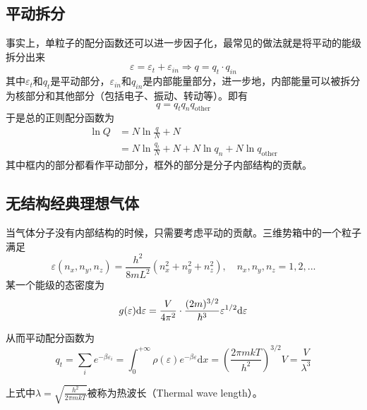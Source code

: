 \subsection{平动拆分} %
\label{sec:平动拆分}
事实上，单粒子的配分函数还可以进一步因子化，最常见的做法就是将平动的能级拆分出来\begin{equation}
    \varepsilon=\varepsilon_t+\varepsilon_{in}\Rightarrow q=q_t\cdot q_{in}
\end{equation}
其中$\varepsilon_t$和$q_t$是平动部分，$\varepsilon_{in}$和$q_{in}$是内部能量部分，进一步地，内部能量可以被拆分为核部分和其他部分（包括电子、振动、转动等）。即有\begin{equation}
    q=q_t q_n q_{\mathrm{other}}
\end{equation}
于是总的正则配分函数为\begin{equation}
\begin{aligned}
    \ln Q& = N \ln\frac{q}{N} +N\\
    & =\boxed{ N\ln \frac{q_t}{N}+N }+N \ln q_n + N \ln q_{\mathrm{other}}
\end{aligned}
\end{equation}
其中框内的部分都看作平动部分，框外的部分是分子内部结构的贡献。
\subsection{无结构经典理想气体} %
\label{sub:无结构经典理想气体}
当气体分子没有内部结构的时候，只需要考虑平动的贡献。三维势箱中的一个粒子满足\begin{equation}
    \varepsilon(n_x,n_y,n_z)=\frac{h^2}{8mL^2} (n_x^2+n_y^2+n_z^2),\quad n_x,n_y,n_z=1,2,...
\end{equation}
某一个能级的态密度为\begin{equation}
    g(\varepsilon)\mathrm{d} \varepsilon =\frac{V}{4\pi^2}\cdot \frac{(2m)^{3/2}}{\hbar^3} \varepsilon^{1/2}\mathrm{d} \varepsilon
\end{equation}

从而平动配分函数为\begin{equation}
    q_t = \sum_i e^{-\beta \varepsilon_i} =\int_{0}^{+\infty} \rho(\varepsilon) e^{-\beta\varepsilon} \mathrm{d}x= \left(\frac{2\pi m k T}{h^2}\right)^{3/2} V =\frac{V}{\lambda^3}
\end{equation}

\begin{definition}
    上式中$\displaystyle \lambda=\sqrt{\frac{h^2}{2\pi m k T}}$被称为热波长（Thermal wave length）。
\end{definition}
